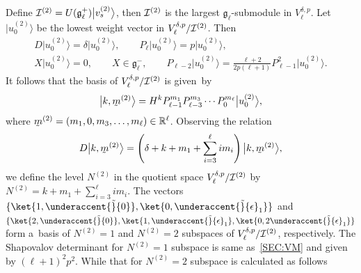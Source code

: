 Def\/ine $ {\cal I}^{(2)} = U({\mathfrak g}_{\ell}^{+}) \big|v_s^{(2)}\big\rangle $, then $ {\cal I}^{(2)} $ is the largest $
{\mathfrak g}_{\ell}$-submodule in $ V^{\delta,p}_{\ell}$.
Let $ \big|u_0^{(2)}\big\rangle  $ be the lowest weight vector in $ V^{\delta,p}_{\ell}/{\cal I}^{(2)}$.
Then
\begin{gather*}
    D \big|u_0^{(2)}\big\rangle  = \delta \big|u_0^{(2)}\big\rangle ,
\qquad
P_{\ell} \big|u_0^{(2)}\big\rangle  = p \big|u_0^{(2)}\big\rangle ,
\nonumber
\\
    X \big|u_0^{(2)}\big\rangle  = 0, \qquad X \in {\mathfrak g}_{\ell}^-,
\qquad
P_{\ell-2} \big|u_0^{(2)}\big\rangle  = \frac{\ell+2}{2p (\ell+1)} P_{\ell-1}^2 \big|u_0^{(2)}\big\rangle .
\end{gather*}
It follows that the basis of $ V^{\delta,p}_{\ell}/{\cal I}^{(2)} $ is given~by
\begin{gather*}
\big|k,\underaccent{\tilde}{m}^{(2)}\big\rangle  = H^k   P_{\ell-1}^{m_1}  P_{\ell-3}^{m_3} \cdots P_{0}^{m_{\ell}}
\big|u_0^{(2)}\big\rangle ,
\end{gather*}
where $ \underaccent{\tilde}{m}^{(2)} = (m_1, 0, m_3, \dots,m_{\ell}) \in {\mathbb R}^{\ell}$.
Observing the relation
\begin{gather*}
D \big|k,\underaccent{\tilde}{m}^{(2)}\big\rangle  = \left(\delta+k +m_1 + \sum\limits_{i=3}^{\ell}i m_i\right)
\big|k,\underaccent{\tilde}{m}^{(2)}\big\rangle ,
\end{gather*}
we def\/ine the level $ N^{(2)} $ in the quotient space $ V^{\delta,p}_{\ell}/{\cal I}^{(2)} $ by $  N^{(2)}
= k + m_1 + \sum\limits_{i=3}^{\ell} i m_{i}$.
The vectors $ \{
\ket{1,\underaccent{\tilde}{0}},
\ket{0,\underaccent{\tilde}{\epsilon}_1}
\} $ and $ \{
\ket{2,\underaccent{\tilde}{0}},
\ket{1,\underaccent{\tilde}{\epsilon}_1},
\ket{0,2\underaccent{\tilde}{\epsilon}_1}
\}$ form a~basis of $ N^{(2)} = 1 $ and $ N^{(2)} = 2 $ subspaces of $ V^{\delta,p}_{\ell}/{\cal I}^{(2)}$,
respectively.
The Shapovalov determinant for $ N^{(2)} = 1 $ subspace is same as~\eqref{SEC:VM} and given by $ (\ell+1)^2 p^2$.
While that for $ N^{(2)} = 2 $ subspace is calculated as follows

